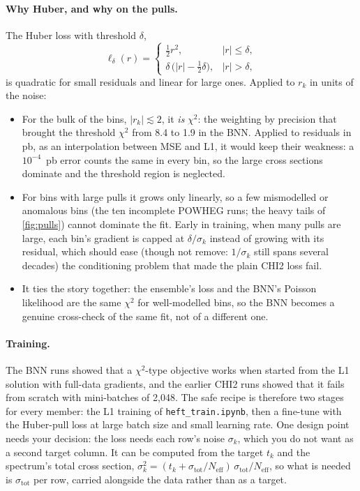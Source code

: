 \documentclass[11pt]{article}
\newcommand{\file}[1]{\nolinkurl{#1}}
\begin{document}
\paragraph{Why Huber, and why on the pulls.} The Huber loss with threshold $\delta$,
\[
  \ell_\delta(r) = \begin{cases} \tfrac12 r^2, & |r| \le \delta,\\
  \delta\,\bigl(|r| - \tfrac12\delta\bigr), & |r| > \delta, \end{cases}
\]
is quadratic for small residuals and linear for large ones. Applied to $r_k$ in units of
the noise:
\begin{itemize}
  \item For the bulk of the bins, $|r_k| \lesssim 2$, it \emph{is} $\chi^2$: the weighting
    by precision that brought the threshold $\chi^2$ from 8.4 to 1.9 in the BNN. Applied to
    residuals in pb, as an interpolation between MSE and L1, it would keep their weakness:
    a $10^{-4}$~pb error counts the same in every bin, so the large cross sections dominate
    and the threshold region is neglected.
  \item For bins with large pulls it grows only linearly, so a few mismodelled or
    anomalous bins (the ten incomplete POWHEG runs; the heavy tails of \cref{fig:pulls})
    cannot dominate the fit. Early in training, when many pulls are large, each bin's
    gradient is capped at $\delta/\sigma_k$ instead of growing with its residual, which
    should ease (though not remove: $1/\sigma_k$ still spans several decades) the
    conditioning problem that made the plain CHI2 loss fail.
  \item It ties the story together: the ensemble's loss and the BNN's Poisson likelihood are
    the same $\chi^2$ for well-modelled bins, so the BNN becomes a genuine cross-check of the
    same fit, not of a different one.
\end{itemize}

\paragraph{Training.} The BNN runs showed that a $\chi^2$-type objective works when
started from the L1 solution with full-data gradients, and the earlier CHI2 runs showed
that it fails from scratch with mini-batches of 2,048. The safe recipe is therefore two
stages for every member: the L1 training of \file{heft_train.ipynb}, then a fine-tune with
the Huber-pull loss at large batch size and small learning rate. One design point needs
your decision: the loss needs each row's noise $\sigma_k$, which you do not want as a
second target column. It can be computed from the target $t_k$ and the spectrum's total
cross section, $\sigma_k^2 = (t_k + \sigma_\text{tot}/N_\text{eff})\,\sigma_\text{tot}/N_\text{eff}$,
so what is needed is $\sigma_\text{tot}$ per row, carried alongside the data rather than as
a target.
\end{document}
